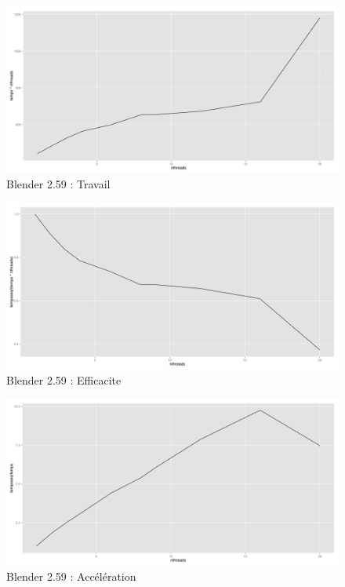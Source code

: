 \documentclass[a4paper,11pt]{article}
\begin{document}
\begin{figure}[htbp]
  \centering
  \includegraphics[scale=0.35]{img/blender2_travail.png}
  \caption{Blender 2.59 : Travail}
\end{figure}

\begin{figure}[htbp]
  \centering
  \includegraphics[scale=0.35]{img/blender2_efficacite.png}
  \caption{Blender 2.59 : Efficacite}
\end{figure}

\begin{figure}[htbp]
  \centering
  \includegraphics[scale=0.35]{img/blender2_acceleration.png}
  \caption{Blender 2.59 : Accélération}
\end{figure}
\end{document}
